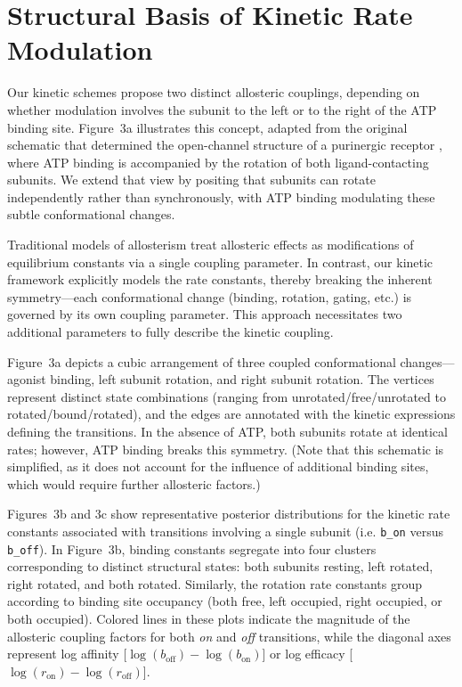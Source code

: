 \documentclass[pdflatex,sn-mathphys-num]{sn-jnl}%
\theoremstyle{thmstyleone}%
\theoremstyle{thmstyletwo}%
\theoremstyle{thmstylethree}%
\begin{document}
\section{Structural Basis of Kinetic Rate Modulation}



Our kinetic schemes propose two distinct allosteric couplings, depending on whether modulation involves the subunit to the left or to the right of the ATP binding site. Figure~3a illustrates this concept, adapted from the original schematic that determined the open-channel structure of a purinergic receptor \cite{abierta_p2x}, where ATP binding is accompanied by the rotation of both ligand-contacting subunits. We extend that view by positing that subunits can rotate independently rather than synchronously, with ATP binding modulating these subtle conformational changes.

Traditional models of allosterism treat allosteric effects as modifications of equilibrium constants via a single coupling parameter. In contrast, our kinetic framework explicitly models the rate constants, thereby breaking the inherent symmetry—each conformational change (binding, rotation, gating, etc.) is governed by its own coupling parameter. This approach necessitates two additional parameters to fully describe the kinetic coupling.

Figure~3a depicts a cubic arrangement of three coupled conformational changes—agonist binding, left subunit rotation, and right subunit rotation. The vertices represent distinct state combinations (ranging from unrotated/free/unrotated to rotated/bound/rotated), and the edges are annotated with the kinetic expressions defining the transitions. In the absence of ATP, both subunits rotate at identical rates; however, ATP binding breaks this symmetry. (Note that this schematic is simplified, as it does not account for the influence of additional binding sites, which would require further allosteric factors.)

Figures~3b and 3c show representative posterior distributions for the kinetic rate constants associated with transitions involving a single subunit (i.e. \texttt{b\_on} versus \texttt{b\_off}). In Figure~3b, binding constants segregate into four clusters corresponding to distinct structural states: both subunits resting, left rotated, right rotated, and both rotated. Similarly, the rotation rate constants group according to binding site occupancy (both free, left occupied, right occupied, or both occupied). Colored lines in these plots indicate the magnitude of the allosteric coupling factors for both \textit{on} and \textit{off} transitions, while the diagonal axes represent log affinity [$\log(b_{\text{off}})-\log(b_{\text{on}})$] or log efficacy [$\log(r_{\text{on}})-\log(r_{\text{off}})$].
\end{document}
